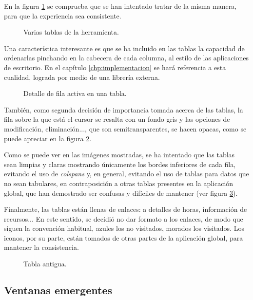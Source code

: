 En la figura \ref{fig:tablas} se comprueba que se han intentado tratar de
la misma manera, para que la experiencia sea consistente.

\begin{figure}
\centering
{}
\caption{Varias tablas de la herramienta.}
\label{fig:tablas}
\end{figure}

Una característica interesante es que se ha incluido en las tablas la capacidad
de ordenarlas pinchando en la cabecera de cada columna, al estilo de las
aplicaciones de escritorio. En el capítulo \ref{chp:implementacion} se hará
referencia a esta cualidad, lograda por medio de una librería externa.

\begin{figure}
\centering
{}
\caption{Detalle de fila activa en una tabla.}
\label{fig:detalle_tabla}
\end{figure}

También, como segunda decisión de importancia tomada acerca de las tablas, la
fila sobre la que está el cursor se resalta con un fondo gris y las opciones de
modificación, eliminación..., que son semitransparentes, se hacen opacas, como
se puede apreciar en la figura \ref{fig:detalle_tabla}.

Como se puede ver en las imágenes mostradas, se ha intentado que
las tablas sean limpias y claras mostrando únicamente los bordes inferiores de
cada fila, evitando el uso de \textit{colspans} y, en general, evitando el uso
de tablas para datos que no sean tabulares, en contraposición a otras tablas
presentes en la aplicación global, que han demostrado ser confusas y difíciles
de mantener (ver figura \ref{fig:tabla_antigua}).

Finalmente, las tablas están llenas de enlaces: a detalles de horas,
información de recursos... En este sentido, se decidió no dar formato a los
enlaces, de modo que siguen la convención habitual, azules los no visitados,
morados los visitados. Los iconos, por su parte, están tomados de otras partes
de la aplicación global, para mantener la consistencia.

\begin{figure}
\centering
{}
\caption{Tabla antigua.}
\label{fig:tabla_antigua}
\end{figure}

\subsection{Ventanas emergentes}

